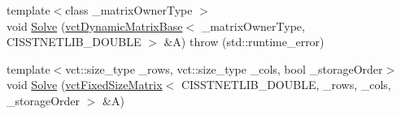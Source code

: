 {\bf }\par
\begin{DoxyCompactItemize}
\item 
{\footnotesize template$<$class \+\_\+matrix\+Owner\+Type $>$ }\\void \hyperlink{classnmr_s_v_d_solver_a8f0a70263a6d3970948ca42f8fb6fb65}{Solve} (\hyperlink{classvct_dynamic_matrix_base}{vct\+Dynamic\+Matrix\+Base}$<$ \+\_\+matrix\+Owner\+Type, C\+I\+S\+S\+T\+N\+E\+T\+L\+I\+B\+\_\+\+D\+O\+U\+B\+L\+E $>$ \&A)  throw (std\+::runtime\+\_\+error)
\item 
{\footnotesize template$<$vct\+::size\+\_\+type \+\_\+rows, vct\+::size\+\_\+type \+\_\+cols, bool \+\_\+storage\+Order$>$ }\\void \hyperlink{classnmr_s_v_d_solver_ad8da94721572ce9dd279873f4934667e}{Solve} (\hyperlink{classvct_fixed_size_matrix}{vct\+Fixed\+Size\+Matrix}$<$ C\+I\+S\+S\+T\+N\+E\+T\+L\+I\+B\+\_\+\+D\+O\+U\+B\+L\+E, \+\_\+rows, \+\_\+cols, \+\_\+storage\+Order $>$ \&A)
\end{DoxyCompactItemize}

